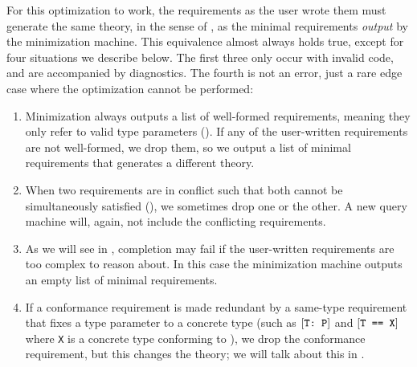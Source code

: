 \documentclass[../generics]{subfiles}
\begin{document}
\begin{center}
\end{center}

For this optimization to work, the requirements as the user wrote them must generate the same theory, in the sense of , as the minimal requirements \emph{output} by the minimization machine. This equivalence almost always holds true, except for four situations we describe below. The first three only occur with invalid code, and are accompanied by diagnostics. The fourth is not an error, just a rare edge case where the optimization cannot be performed:
\begin{enumerate}
\item Minimization always outputs a list of well-formed requirements, meaning they only refer to valid type parameters (). If any of the user-written requirements are not well-formed, we drop them, so we output a list of minimal requirements that generates a different theory.

\item When two requirements are in conflict such that both cannot be simultaneously satisfied (), we sometimes drop one or the other. A new query machine will, again, not include the conflicting requirements.

\item As we will see in , completion may fail if the user-written requirements are too complex to reason about. In this case the minimization machine outputs an empty list of minimal requirements.

\item If a conformance requirement is made redundant by a same-type requirement that fixes a type parameter to a concrete type (such as $[\texttt{T:~P}]$ and $[\texttt{T == X}]$ where \texttt{X} is a concrete type conforming to \tP), we drop the conformance requirement, but this changes the theory; we will talk about this in .
\end{enumerate}
\end{document}
